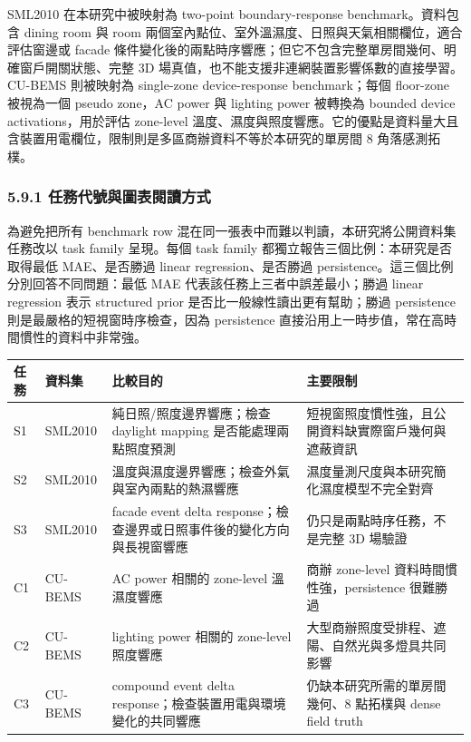 \documentclass[12pt,a4paper]{article}
\begin{document}
SML2010 在本研究中被映射為 two-point boundary-response benchmark。資料包含 dining room 與 room 兩個室內點位、室外溫濕度、日照與天氣相關欄位，適合評估窗邊或 facade 條件變化後的兩點時序響應；但它不包含完整單房間幾何、明確窗戶開關狀態、完整 3D 場真值，也不能支援非連網裝置影響係數的直接學習。CU-BEMS 則被映射為 single-zone device-response benchmark；每個 floor-zone 被視為一個 pseudo zone，AC power 與 lighting power 被轉換為 bounded device activations，用於評估 zone-level 溫度、濕度與照度響應。它的優點是資料量大且含裝置用電欄位，限制則是多區商辦資料不等於本研究的單房間 8 角落感測拓樸。


\subsubsection*{5.9.1 任務代號與圖表閱讀方式}

為避免把所有 benchmark row 混在同一張表中而難以判讀，本研究將公開資料集任務改以 task family 呈現。每個 task family 都獨立報告三個比例：本研究是否取得最低 MAE、是否勝過 linear regression、是否勝過 persistence。這三個比例分別回答不同問題：最低 MAE 代表該任務上三者中誤差最小；勝過 linear regression 表示 structured prior 是否比一般線性讀出更有幫助；勝過 persistence 則是最嚴格的短視窗時序檢查，因為 persistence 直接沿用上一時步值，常在高時間慣性的資料中非常強。


\begin{table}[htbp]
\centering
\footnotesize
\renewcommand{\arraystretch}{1.25}
\begin{tabular}{|>{\raggedright\arraybackslash}p{}|>{\raggedright\arraybackslash}p{}|>{\raggedright\arraybackslash}p{}|>{\raggedright\arraybackslash}p{}|}
\hline
\textbf{任務} & \textbf{資料集} & \textbf{比較目的} & \textbf{主要限制} \\
\hline
S1 & SML2010 & 純日照/照度邊界響應；檢查 daylight mapping 是否能處理兩點照度預測 & 短視窗照度慣性強，且公開資料缺實際窗戶幾何與遮蔽資訊 \\
\hline
S2 & SML2010 & 溫度與濕度邊界響應；檢查外氣與室內兩點的熱濕響應 & 濕度量測尺度與本研究簡化濕度模型不完全對齊 \\
\hline
S3 & SML2010 & facade event delta response；檢查邊界或日照事件後的變化方向與長視窗響應 & 仍只是兩點時序任務，不是完整 3D 場驗證 \\
\hline
C1 & CU-BEMS & AC power 相關的 zone-level 溫濕度響應 & 商辦 zone-level 資料時間慣性強，persistence 很難勝過 \\
\hline
C2 & CU-BEMS & lighting power 相關的 zone-level 照度響應 & 大型商辦照度受排程、遮陽、自然光與多燈具共同影響 \\
\hline
C3 & CU-BEMS & compound event delta response；檢查裝置用電與環境變化的共同響應 & 仍缺本研究所需的單房間幾何、8 點拓樸與 dense field truth \\
\hline
\end{tabular}
\end{table}
\end{document}
